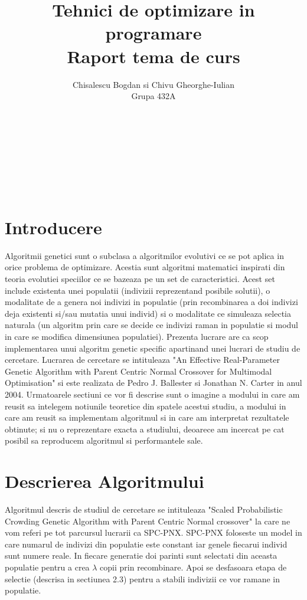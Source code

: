 \documentclass[a4paper]{article}
\title{\huge Tehnici de optimizare in programare
\\Raport tema de curs
}
\author{Chisalescu Bogdan  si  Chivu Gheorghe-Iulian
\\ Grupa 432A
}
\date{}
\begin{document}
\maketitle
\vphantom{} \\ \\ \\ \\ \\
\section{Introducere}
\Large 
Algoritmii genetici sunt o subclasa a algoritmilor evolutivi ce se pot aplica in orice problema de optimizare. Acestia sunt algoritmi matematici inspirati din teoria evolutiei speciilor ce se bazeaza pe un set de caracteristici. Acest set include existenta unei populatii (indivizii reprezentand posibile solutii), o modalitate de a genera noi indivizi in populatie (prin recombinarea a doi indivizi deja existenti si/sau mutatia unui individ) si o modalitate ce simuleaza selectia naturala (un algoritm prin care se decide ce indivizi raman in populatie si modul in care se modifica dimensiunea populatiei).
\newline
Prezenta lucrare are ca scop implementarea unui algoritm genetic specific apartinand unei lucrari de studiu de cercetare. Lucrarea de cercetare se intituleaza "An Effective Real-Parameter Genetic Algorithm with Parent Centric Normal Crossover for Multimodal Optimisation" si este realizata de Pedro J. Ballester si Jonathan N. Carter in anul 2004. 
\newline
Urmatoarele sectiuni ce vor fi descrise sunt o imagine a modului in care am reusit sa intelegem notiunile teoretice din spatele acestui studiu, a modului in care am reusit sa implementam algoritmul si in care am interpretat rezultatele obtinute; si nu o reprezentare exacta a studiului, deoarece am incercat pe cat posibil sa reproducem algoritmul si performantele sale.
\newpage

\section{Descrierea Algoritmului}

Algoritmul descris de studiul de cercetare se intituleaza "Scaled Probabilistic Crowding Genetic Algorithm with Parent Centric Normal crossover" la care ne vom referi pe tot parcursul lucrarii ca SPC-PNX. 
\newline
SPC-PNX foloseste un model in care numarul de indivizi din populatie este constant iar genele fiecarui individ sunt numere reale. In fiecare generatie doi parinti sunt selectati din aceasta populatie pentru a crea $\lambda$ copii prin recombinare. Apoi se desfasoara etapa de selectie (descrisa in sectiunea 2.3) pentru a stabili indivizii ce vor ramane in populatie. 
\end{document}
